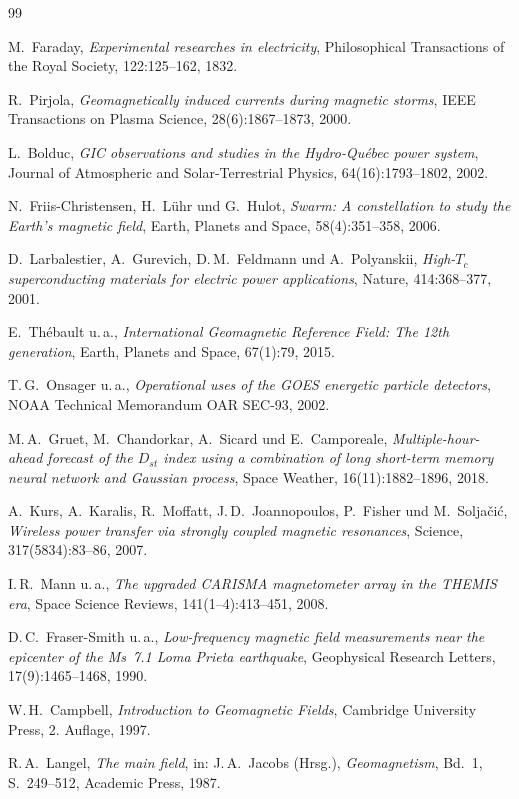 ﻿\documentclass[a4paper,12pt]{article}
\theoremstyle{definition}
\begin{document}
\begin{thebibliography}{99}

M.~Faraday,
\emph{Experimental researches in electricity},
Philosophical Transactions of the Royal Society,
122:125--162, 1832.

R.~Pirjola,
\emph{Geomagnetically induced currents during magnetic storms},
IEEE Transactions on Plasma Science,
28(6):1867--1873, 2000.

L.~Bolduc,
\emph{GIC observations and studies in the Hydro-Qu\'ebec power system},
Journal of Atmospheric and Solar-Terrestrial Physics,
64(16):1793--1802, 2002.

N.~Friis-Christensen, H.~L\"uhr und G.~Hulot,
\emph{Swarm: A constellation to study the Earth's magnetic field},
Earth, Planets and Space,
58(4):351--358, 2006.

D.~Larbalestier, A.~Gurevich, D.\,M.~Feldmann und A.~Polyanskii,
\emph{High-$T_c$ superconducting materials for electric power applications},
Nature, 414:368--377, 2001.

E.~Th\'ebault u.\,a.,
\emph{International Geomagnetic Reference Field: The 12th generation},
Earth, Planets and Space, 67(1):79, 2015.

T.\,G.~Onsager u.\,a.,
\emph{Operational uses of the GOES energetic particle detectors},
NOAA Technical Memorandum OAR SEC-93, 2002.

M.\,A.~Gruet, M.~Chandorkar, A.~Sicard und E.~Camporeale,
\emph{Multiple-hour-ahead forecast of the $D_{st}$ index using a combination
of long short-term memory neural network and Gaussian process},
Space Weather, 16(11):1882--1896, 2018.

A.~Kurs, A.~Karalis, R.~Moffatt, J.\,D.~Joannopoulos, P.~Fisher und
M.~Solja\v{c}i\'c,
\emph{Wireless power transfer via strongly coupled magnetic resonances},
Science, 317(5834):83--86, 2007.

I.\,R.~Mann u.\,a.,
\emph{The upgraded CARISMA magnetometer array in the THEMIS era},
Space Science Reviews, 141(1--4):413--451, 2008.

D.\,C.~Fraser-Smith u.\,a.,
\emph{Low-frequency magnetic field measurements near the epicenter of the
Ms~7.1 Loma Prieta earthquake},
Geophysical Research Letters, 17(9):1465--1468, 1990.

W.\,H.~Campbell,
\emph{Introduction to Geomagnetic Fields},
Cambridge University Press, 2. Auflage, 1997.

R.\,A.~Langel,
\emph{The main field},
in: J.\,A.~Jacobs (Hrsg.), \emph{Geomagnetism}, Bd.~1, S.~249--512,
Academic Press, 1987.

\end{thebibliography}
\end{document}
